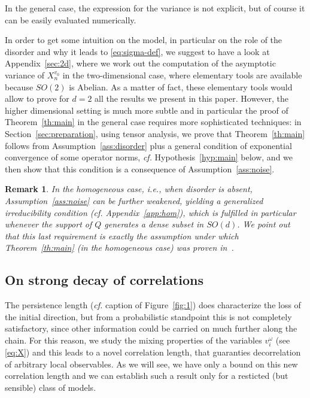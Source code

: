 \documentclass[a4paper,reqno,11pt]{amsart}
\numberwithin{equation}{section}
\newtheorem{rem}[theorem]{Remark}
\begin{document}
\smallskip
\noindent
In the general case, the expression for the variance is not explicit, but of course
it can be easily evaluated numerically.

\smallskip

In order to get some intuition on the model, in particular  on
the role of the disorder and  why it leads to \eqref{eq:sigma-def},
we suggest to have a look at
Appendix~\ref{sec:2d}, where we work out the computation of the asymptotic
variance of $X_n^{v_0}$ in the two-dimensional case, where elementary
tools are available because $SO(2)$ is Abelian.
As a matter of fact, these elementary tools would allow to
prove for $d=2$ all the results we present in this paper.
However, the higher dimensional setting is
much more subtle and in particular
the proof of Theorem~\ref{th:main} in the general case requires
more sophisticated techniques: in Section~\ref{sec:preparation},
using tensor analysis, we prove that Theorem~\ref{th:main} follows from
Assumption~\ref{ass:disorder} plus
a general condition of exponential convergence of some operator
norms, {\sl cf.} Hypothesis~\ref{hyp:main} below, and we then show that this condition is
a consequence of Assumption~\ref{ass:noise}.

\medskip

\begin{rem}\rm \label{rem:hom}
In the {\sl homogeneous} case, i.e., when disorder is absent,
Assumption~\ref{ass:noise} can be further weakened, yielding a
{\sl generalized irreducibility condition} (cf. Appendix~\ref{app:hom}),
which is fulfilled in particular whenever
the support of $Q$ generates a dense subset in $SO(d)$.
We point out that this last requirement is exactly the assumption under
which Theorem~\ref{th:main} (in the homogeneous case) was
proven in~\cite{cf:Gor,cf:Roynette}.
\end{rem}

\medskip





\subsection{On strong decay of correlations}

\label{sec:corrs}
The persistence length ({\sl cf.} caption of Figure~\ref{fig:1})
does characterize the loss of the initial direction, but
from a probabilistic standpoint this is not completely satisfactory,
since other information could be carried on much further along the chain.
For this reason, we study the mixing properties of the variables
$v_i^\omega$ (see \eqref{eq:X})
and this leads to a novel correlation length, that guaranties decorrelation of
arbitrary local observables.
As we will see, we have only a bound on this new correlation length
and we can establish such a result
only for a resticted (but sensible) class of models.
\end{document}
